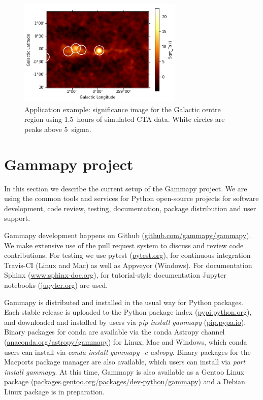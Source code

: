\documentclass{PoS}
\newcommand{\urlGammapyGithub}{\href{https://github.com/gammapy/gammapy}{github.com/gammapy/gammapy}}
\newcommand{\urlPytest}{\href{https://pytest.org}{pytest.org}}
\newcommand{\urlSphinx}{\href{http://www.sphinx-doc.org}{www.sphinx-doc.org}}
\newcommand{\urlJupyter}{\href{https://jupyter.org}{jupyter.org}}
\newcommand{\urlPypi}{\href{https://pypi.python.org}{pypi.python.org}}
\newcommand{\urlPip}{\href{https://pip.pypa.io}{pip.pypa.io}}
\newcommand{\urlAnacondaGammapy}{\href{https://anaconda.org/astropy/gammapy}{anaconda.org/astropy/gammapy}}
\newcommand{\urlGentooGammapy}{\href{https://packages.gentoo.org/packages/dev-python/gammapy}{packages.gentoo.org/packages/dev-python/gammapy}}
\begin{document}


\begin{figure}[t]
\centering
\includegraphics[width=0.7\textwidth]{figures/gammapy_example_sky_image.png}
\caption{
Application example: significance image for the Galactic centre region using
1.5~hours of simulated CTA data.  White circles are peaks above 5~sigma.
}
\label{fig:app}
\end{figure}

\section{Gammapy project}
\label{sec:project}

In this section we describe the current setup of the Gammapy project. We are using the common tools and services for Python open-source projects for software
development, code review, testing, documentation, package distribution and user
support.

Gammapy development happens on Github (\urlGammapyGithub). We make extensive use
of the pull request system to discuss and review code contributions. For testing
we use pytest (\urlPytest), for continuous integration Travis-CI (Linux and Mac)
as well as Appveyor (Windows). For documentation Sphinx (\urlSphinx), for
tutorial-style documentation Jupyter notebooks (\urlJupyter) are used.

Gammapy is distributed and installed in the usual way for Python packages. Each
stable release is uploaded to the Python package index (\urlPypi), and
downloaded and installed by users via {\it pip install gammapy} (\urlPip).
Binary packages for conda are available via the conda Astropy channel
(\urlAnacondaGammapy) for Linux, Mac and Windows, which conda users can install
via {\it conda install gammapy -c astropy}. Binary packages for the Macports
package manager are also available, which users can install via {\it port
install gammapy}. At this time, Gammapy is also available as a Gentoo Linux
package (\urlGentooGammapy) and a Debian Linux package is in preparation.
\end{document}

